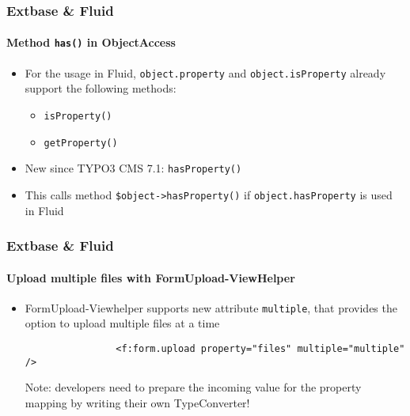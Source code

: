 \begin{frame}[fragile]
	\frametitle{Extbase \& Fluid}
	\framesubtitle{Method \texttt{has()} in ObjectAccess}

	\begin{itemize}

		\item For the usage in Fluid, \texttt{object.property} and \texttt{object.isProperty} already
			support the following methods:

			\begin{itemize}
				\item \texttt{isProperty()}
				\item \texttt{getProperty()}
			\end{itemize}

		\item New since TYPO3 CMS 7.1: \texttt{hasProperty()}
		\item This calls method \texttt{\$object->hasProperty()}\newline
			if \texttt{object.hasProperty} is used in Fluid

	\end{itemize}

\end{frame}


\begin{frame}[fragile]
	\frametitle{Extbase \& Fluid}
	\framesubtitle{Upload multiple files with FormUpload-ViewHelper}

	\begin{itemize}

		\item FormUpload-Viewhelper supports new attribute \texttt{multiple}, that provides the
			option to upload multiple files at a time

			\begin{lstlisting}
				<f:form.upload property="files" multiple="multiple" />
			\end{lstlisting}

			\vspace{0.2cm}

			\begingroup
				\color{red}
					Note: developers need to prepare the incoming value for the property mapping by
					writing their own TypeConverter!
			\endgroup

	\end{itemize}

\end{frame}

